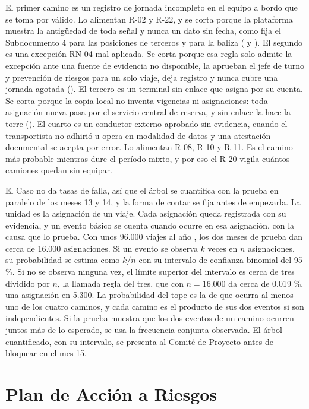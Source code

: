 El primer camino es un registro de jornada incompleto en el equipo a bordo que se toma por válido. Lo
alimentan R-02 y R-22, y se corta porque la plataforma muestra la antigüedad de toda señal y nunca un
dato sin fecha, como fija el Subdocumento 4 para las posiciones de terceros y para la baliza
( y ).
El segundo es una excepción RN-04 mal aplicada. Se corta porque esa regla solo admite la excepción ante
una fuente de evidencia no disponible, la aprueban el jefe de turno y prevención de riesgos para un solo
viaje, deja registro y nunca cubre una jornada agotada (). El tercero es
un terminal sin enlace que asigna por su cuenta. Se corta porque la copia local no inventa vigencias ni
asignaciones: toda asignación nueva pasa por el servicio central de reserva, y sin enlace la hace la
torre (). El cuarto
es un conductor externo aprobado sin evidencia, cuando el transportista no adhirió u opera en modalidad
de datos y una atestación documental se acepta por error. Lo alimentan R-08, R-10 y R-11. Es el camino
más probable mientras dure el período mixto, y por eso el R-20 vigila cuántos camiones quedan sin
equipar.

El Caso no da tasas de falla, así que el árbol se cuantifica con la prueba en paralelo de los meses 13
y 14, y la forma de contar se fija antes de empezarla. La unidad es la asignación de un viaje. Cada
asignación queda registrada con su evidencia, y un evento básico se cuenta cuando ocurre en esa
asignación, con la causa que lo prueba. Con unos 96.000 viajes al año , los dos
meses de prueba dan cerca de 16.000 asignaciones. Si un evento se observa $k$ veces en $n$ asignaciones,
su probabilidad se estima como $k/n$ con su intervalo de confianza binomial del 95 \%. Si no se observa
ninguna vez, el límite superior del intervalo es cerca de tres dividido por $n$, la llamada regla del tres, que con
$n = 16.000$ da cerca de 0,019 \%, una asignación en 5.300. La probabilidad del tope es la de que ocurra al menos uno de los cuatro caminos, y
cada camino es el producto de sus dos eventos si son independientes. Si la prueba muestra que los dos
eventos de un camino ocurren juntos más de lo esperado, se usa la frecuencia conjunta observada. El
árbol cuantificado, con su intervalo, se presenta al Comité de Proyecto antes de bloquear en el mes 15.

\section{Plan de Acción a Riesgos}\label{sec:8-accion}

